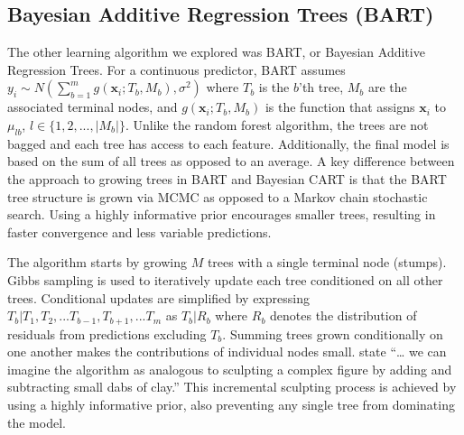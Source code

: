 \documentclass[
  12pt,
  letterpaper,
  DIV=11,
  numbers=noendperiod]{scrartcl}
\newcommand{\bm}{\mathbf}
\begin{document}
\subsection{Bayesian Additive Regression Trees
(BART)}\label{bayesian-additive-regression-trees-bart}

The other learning algorithm we explored was BART, or Bayesian Additive
Regression Trees. For a continuous predictor, BART assumes
\(y_i\sim N(\sum_{b=1}^m g(\bm x_i;T_b,M_b), \sigma^2)\) where \(T_b\)
is the \(b\)'th tree, \(M_b\) are the associated terminal nodes, and
\(g(\bm x_i;T_b,M_b)\) is the function that assigns \(\bm x_i\) to
\(\mu_{lb}\), \(l\in\{1,2,...,|M_b|\}\). Unlike the random forest
algorithm, the trees are not bagged and each tree has access to each
feature. Additionally, the final model is based on the sum of all trees
as opposed to an average. A key difference between the approach to
growing trees in BART and Bayesian CART is that the BART tree structure
is grown via MCMC as opposed to a Markov chain stochastic search. Using
a highly informative prior encourages smaller trees, resulting in faster
convergence and less variable predictions.

The algorithm starts by growing \(M\) trees with a single terminal node
(stumps). Gibbs sampling is used to iteratively update each tree
conditioned on all other trees. Conditional updates are simplified by
expressing \(T_b|T_1,T_2,...T_{b-1},T_{b+1},...T_m\) as \(T_b|R_b\)
where \(R_b\) denotes the distribution of residuals from predictions
excluding \(T_b\). Summing trees grown conditionally on one another
makes the contributions of individual nodes small. \citep{bart_paper}
state ``\ldots{} we can imagine the algorithm as analogous to sculpting
a complex figure by adding and subtracting small dabs of clay.'' This
incremental sculpting process is achieved by using a highly informative
prior, also preventing any single tree from dominating the model.
\end{document}

